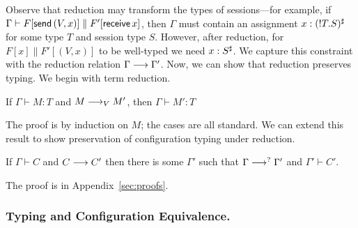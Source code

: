 \documentclass[oribibl,orivec,envcountsame]{llncs}
\begin{document}
Observe that reduction may transform the types of sessions---for example, if $\Gamma \vdash
F[\mathsf{send}\,(V,x)] \parallel F'[\mathsf{receive}\, x]$, then $\Gamma$ must contain an
assignment $x : ({!T.S})^\sharp$ for some type $T$ and session type $S$. However, after
reduction, for $F[x] \parallel F'[(V,x)]$ to be well-typed we need $x:S^\sharp$. We capture this
constraint with the reduction relation $\Gamma \longrightarrow \Gamma'$. Now, we can show that reduction
preserves typing. We begin with term reduction.
%
\begin{lemma}\label{lem:term-preservation}
  If $\Gamma \vdash M: T$ and $M \longrightarrow_V M'$, then $\Gamma \vdash M': T$
\end{lemma}
%
The proof is by induction on $M$; the cases are all standard.  We can extend this result to show
preservation of configuration typing under reduction.
%
\begin{theorem}\label{thm:preservation}
  If $\Gamma \vdash C$ and $C \longrightarrow C'$ then there is some $\Gamma'$ such that $\Gamma \longrightarrow^?
  \Gamma'$ and $\Gamma' \vdash C'$.
\end{theorem}
%
The proof is in Appendix~\ref{sec:proofs}.

\subsubsection{Typing and Configuration Equivalence.}
\end{document}
